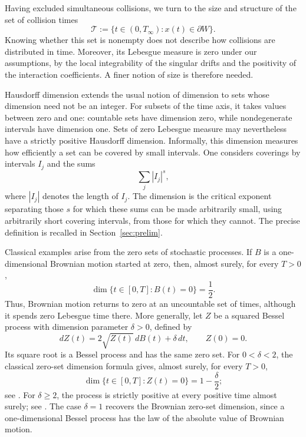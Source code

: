 \documentclass{article}
\numberwithin{equation}{section}
\theoremstyle{plain}
\begin{document}
Having excluded simultaneous collisions, we turn to the size
and structure of the set of collision times
\begin{equation*}
    \mathcal T:=\{t\in(0,T_\infty):x(t)\in\partial W\}.
\end{equation*}
Knowing whether this set is nonempty does not describe how
collisions are distributed in time. Moreover, its Lebesgue
measure is zero under our assumptions, by the local
integrability of the singular drifts and the positivity of the interaction coefficients. A finer notion of size is therefore needed.

Hausdorff dimension extends the usual notion of dimension to sets whose dimension need not be an integer. For subsets of the time axis, it takes values between zero and one: countable sets have dimension zero, while nondegenerate intervals have dimension one. Sets of zero Lebesgue measure
may nevertheless have a strictly positive Hausdorff dimension. Informally, this dimension measures how efficiently a set can be covered by small intervals. One considers coverings by intervals $I_j$ and the sums
\begin{equation*}
    \sum_j |I_j|^s,
\end{equation*}
where $|I_j|$ denotes the length of $I_j$. The dimension is the critical exponent separating those $s$ for which these sums can be made arbitrarily small, using arbitrarily short covering intervals, from those for which they cannot. The precise definition is recalled in Section~\ref{sec:prelim}.

Classical examples arise from the zero sets of stochastic processes. If $B$ is a one-dimensional Brownian motion started at zero, then, almost surely, for every $T>0$,
\begin{equation*}
    \dim\{t\in[0,T]:B(t)=0\}=\frac12.
\end{equation*}
Thus, Brownian motion returns to zero at an uncountable set of times, although it spends zero Lebesgue time there. More generally, let $Z$ be a squared Bessel process with dimension parameter $\delta>0$, defined by
\begin{equation*}
    dZ(t)=2\sqrt{Z(t)}\,dB(t)+\delta\,dt,
    \qquad Z(0)=0.
\end{equation*}
Its square root is a Bessel process and has the same zero set. For $0<\delta<2$, the classical zero-set dimension formula gives, almost surely, for every $T>0$,
\begin{equation*}
    \dim\{t\in[0,T]:Z(t)=0\}=1-\frac{\delta}{2};
\end{equation*}
see \cite[Theorem 4.2]{LiuXiao98}. For $\delta\geq2$, the process is strictly positive at every positive time almost surely; see \cite[Corollary 1]{GoeingJaeshckeYor03}. The case $\delta=1$ recovers the Brownian zero-set dimension, since a one-dimensional Bessel process has the law of the absolute value of Brownian motion.
\end{document}
